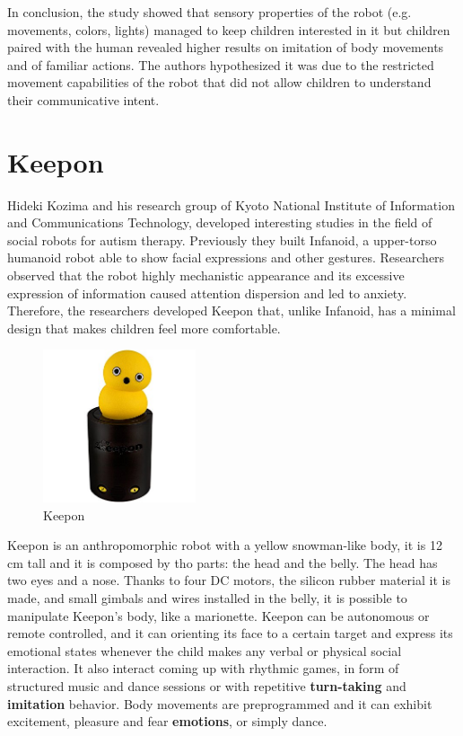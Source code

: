 In conclusion, the study showed that sensory properties of the robot (e.g. movements, colors, lights) managed to keep children interested in it but children paired with the human revealed higher results on imitation of body movements and of familiar actions. The authors hypothesized it was due to the restricted movement capabilities of the robot that did not allow children to understand their communicative intent.

\section{Keepon}
Hideki Kozima and his research group of Kyoto National Institute of Information and Communications Technology, developed interesting studies in the field of social robots for autism therapy\cite{kozima2009keepon}. Previously they built Infanoid, a upper-torso humanoid robot able to show facial expressions and other gestures. Researchers observed that the robot highly mechanistic appearance and its excessive expression of information caused attention dispersion and led to anxiety. Therefore, the researchers developed Keepon that, unlike Infanoid, has a minimal design that makes children feel more comfortable.
\begin{figure}[h]
	\centering
	\includegraphics[width=0.4\textwidth]{keepon}
	\caption{Keepon}
	\label{fig:Keepon}
\end{figure}
Keepon is an anthropomorphic robot with a yellow snowman-like body, it is 12 cm tall and it is composed by tho parts: the head and the belly. The head has two eyes and a nose. Thanks to four DC motors, the silicon rubber material it is made, and small gimbals and wires installed in the belly, it is possible to manipulate Keepon's body, like a marionette.
Keepon can be autonomous or remote controlled, and it can orienting its face to a certain target and express its emotional states whenever the child makes any verbal or physical social interaction. It also interact coming up with rhythmic games, in form of structured music and dance sessions or with repetitive \textbf{turn-taking} and \textbf{imitation} behavior. Body movements are preprogrammed and it can exhibit excitement, pleasure and fear \textbf{emotions}, or simply dance.
